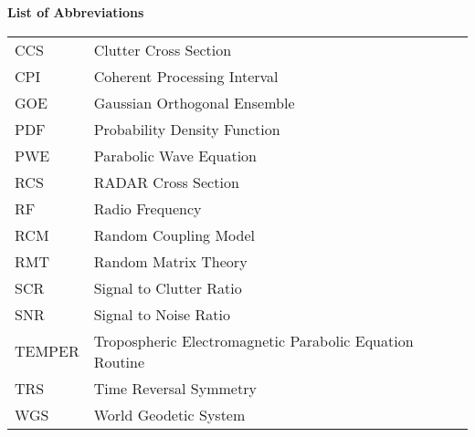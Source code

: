 \noindent\Large{\bf{List of Abbreviations}}

\vspace{24pt}

\small\normalsize

\begin{supertabular}{ll}
CCS & Clutter Cross Section \\
CPI & Coherent Processing Interval \\
GOE & Gaussian Orthogonal Ensemble \\
PDF & Probability Density Function \\
PWE & Parabolic Wave Equation \\
RCS & RADAR Cross Section \\
RF & Radio Frequency \\
RCM & Random Coupling Model \\
RMT & Random Matrix Theory \\
SCR & Signal to Clutter Ratio \\
SNR & Signal to Noise Ratio\\
TEMPER & Tropospheric Electromagnetic Parabolic Equation Routine \\
TRS & Time Reversal Symmetry \\
WGS & World Geodetic System \\
\end{supertabular}

